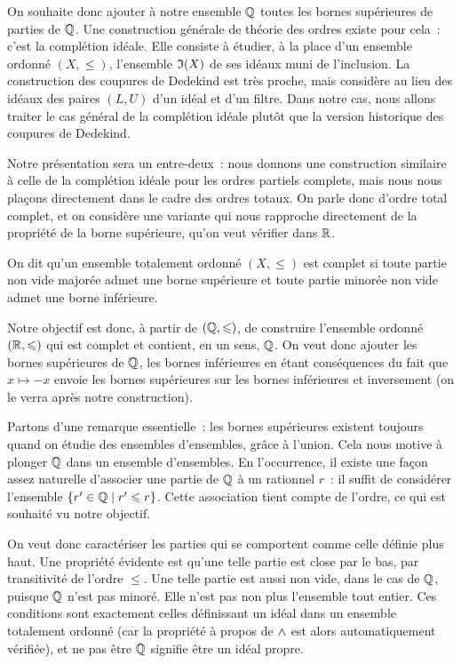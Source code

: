 On souhaite donc ajouter à notre ensemble $\mathbb Q$ toutes les bornes
supérieures de parties de $\mathbb Q$. Une construction générale de théorie des
ordres existe pour cela~: c'est la complétion idéale. Elle consiste à étudier,
à la place d'un ensemble ordonné $(X,\leq)$, l'ensemble $\mathfrak{I}(X)$ de ses
idéaux muni de l'inclusion. La construction des coupures de Dedekind est très
proche, mais considère au lieu des idéaux des paires $(L,U)$ d'un idéal et d'un
filtre. Dans notre cas, nous allons traiter le cas général de la complétion
idéale plutôt que la version historique des coupures de Dedekind.

Notre présentation sera un entre-deux~: nous donnons une construction
similaire à celle de la complétion idéale pour les ordres partiels complets,
mais nous nous plaçons directement dans le cadre des ordres totaux. On parle
donc d'ordre total complet, et on considère une variante qui nous rapproche
directement de la propriété de la borne supérieure, qu'on veut vérifier dans
$\mathbb R$.

\begin{definition}
  On dit qu'un ensemble totalement ordonné $(X,\leq)$ est complet si toute
  partie non vide majorée admet une borne supérieure et toute partie minorée
  non vide admet une borne inférieure.
\end{definition}

Notre objectif est donc, à partir de $(\mathbb Q,\leqslant)$, de construire
l'ensemble ordonné $(\mathbb R,\leqslant)$ qui est complet et contient, en un sens,
$\mathbb Q$. On veut donc \og ajouter les bornes supérieures\fg{} de $\mathbb Q$,
les bornes inférieures en étant conséquences du fait que $x\mapsto -x$ envoie
les bornes supérieures sur les bornes inférieures et inversement (on le verra
après notre construction).

Partons d'une remarque essentielle~: les bornes supérieures existent toujours
quand on étudie des ensembles d'ensembles, grâce à l'union. Cela nous motive à
plonger $\mathbb Q$ dans un ensemble d'ensembles. En l'occurrence, il existe une
façon assez naturelle d'associer une partie de $\mathbb Q$ à un rationnel $r$~:
il suffit de considérer l'ensemble $\left\{ r' \in \mathbb Q \;\middle\vert\; r' \leqslant r \right\}$. Cette
association tient compte de l'ordre, ce qui est souhaité vu notre objectif.

On veut donc caractériser les parties qui se comportent comme celle définie plus
haut. Une propriété évidente est qu'une telle partie est close par le bas, par
transitivité de l'ordre $\leq$. Une telle partie est aussi non vide, dans le cas
de $\mathbb Q$, puisque $\mathbb Q$ n'est pas minoré. Elle n'est pas non plus
l'ensemble tout entier. Ces conditions sont exactement celles définissant un
idéal dans un ensemble totalement ordonné (car la propriété à propos de $\wedge$
est alors automatiquement vérifiée), et ne pas être $\mathbb Q$ signifie être un
idéal propre.

